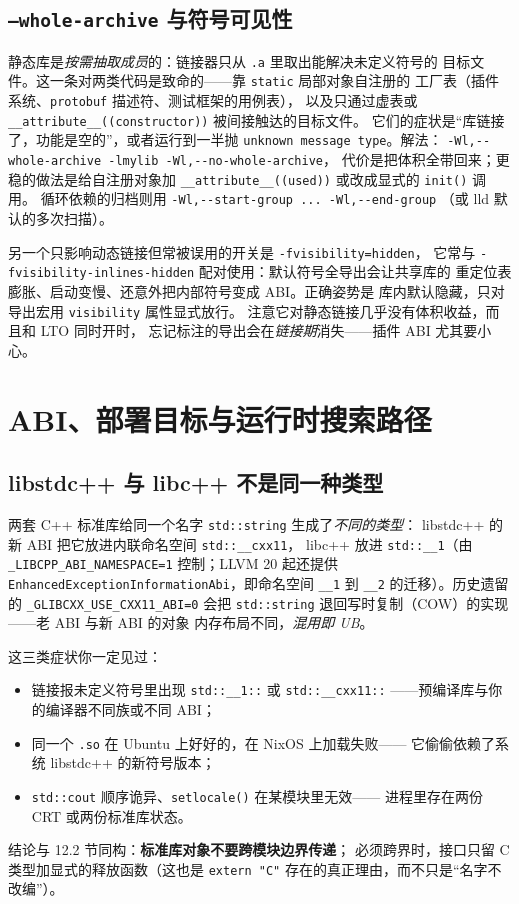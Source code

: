 \documentclass[12pt,a4paper,fontset=fandol]{ctexbook}
\newcommand{\Fn}[1]{\texttt{#1()}}
\newcommand{\Tp}[1]{\texttt{#1}}
\newcommand{\Bk}{\allowbreak}
\begin{document}
\subsection{\Tp{--whole-archive} 与符号可见性}

静态库是\emph{按需抽取成员}的：链接器只从 \Tp{.a} 里取出能解决未定义符号的
目标文件。这一条对两类代码是致命的——靠 \Tp{static} 局部对象自注册的
工厂表（插件系统、\Tp{protobuf} 描述符、测试框架的用例表），
以及只通过虚表或 \lstinline{__attribute__((constructor))} 被间接触达的目标文件。
它们的症状是``库链接了，功能是空的''，或者运行到一半抛
\lstinline|unknown message type|。解法：
\lstinline|-Wl,--whole-archive -lmylib -Wl,--no-whole-archive|，
代价是把体积全带回来；更稳的做法是给自注册对象加
\lstinline{__attribute__((used))} 或改成显式的 \Fn{init} 调用。
循环依赖的归档则用 \lstinline|-Wl,--start-group ... -Wl,--end-group|
（或 lld 默认的多次扫描）。

另一个只影响动态链接但常被误用的开关是 \Tp{-fvisibility=hidden}，
它常与 \Tp{-fvisibility-{\Bk}inlines-{\Bk}hidden} 配对使用：默认符号全导出会让共享库的
重定位表膨胀、启动变慢、还意外把内部符号变成 ABI。正确姿势是
库内默认隐藏，只对导出宏用 \Tp{visibility} 属性显式放行。
注意它对静态链接几乎没有体积收益，而且和 LTO 同时开时，
忘记标注的导出会在\emph{链接期}消失——插件 ABI 尤其要小心。

\section{ABI、部署目标与运行时搜索路径}

\subsection{libstdc++ 与 libc++ 不是同一种类型}

两套 C++ 标准库给同一个名字 \Tp{std::string} 生成了\emph{不同的类型}：
libstdc++ 的新 ABI 把它放进内联命名空间 \Tp{std::\_\_cxx11}，
libc++ 放进 \Tp{std::\_\_1}（由
\Tp{\_LIBCPP\Bk\_ABI\Bk\_NAMESPACE=1} 控制；LLVM 20 起还提供
\Tp{EnhancedExceptionInformationAbi}，即命名空间 \Tp{\_\_1} 到 \Tp{\_\_2}
的迁移）。历史遗留的 \Tp{\_GLIBCXX\_USE\_CXX11\_ABI=0} 会把
\Tp{std::string} 退回写时复制（COW）的实现——老 ABI 与新 ABI 的对象
内存布局不同，\emph{混用即 UB}。

这三类症状你一定见过：
\begin{itemize}
\item 链接报未定义符号里出现 \Tp{std::\_\_1::} 或 \Tp{std::\_\_cxx11::}
      ——预编译库与你的编译器不同族或不同 ABI；
\item 同一个 \Tp{.so} 在 Ubuntu 上好好的，在 NixOS 上加载失败——
      它偷偷依赖了系统 libstdc++ 的新符号版本；
\item \Tp{std::cout} 顺序诡异、\Fn{setlocale} 在某模块里无效——
      进程里存在两份 CRT 或两份标准库状态。
\end{itemize}
结论与 12.2 节同构：\textbf{标准库对象不要跨模块边界传递}；
必须跨界时，接口只留 C 类型加显式的释放函数（这也是
\lstinline|extern "C"| 存在的真正理由，而不只是``名字不改编''）。
\end{document}
